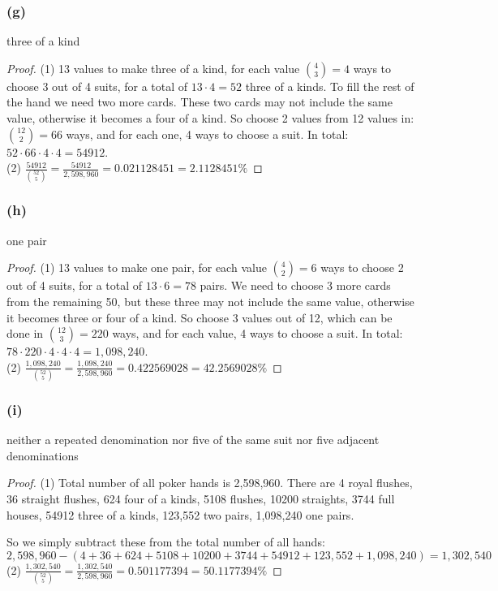 \documentclass[14pt]{extarticle}
\begin{document}
\subsubsection{(g)}
three of a kind

\begin{proof}
(1) 13 values to make three of a kind, for each value \(\binom{4}{3} = 4\) ways to choose 3 out of 4 suits, for a
total of \(13 \cdot 4 = 52\) three of a kinds. To fill the rest of the hand we need two more cards. These two cards may
not include the same value, otherwise it becomes a four of a kind. So choose 2 values from 12 values in: \(\binom{12}{2} = 
66\) ways, and for each one, 4 ways to choose a suit. In total: \(52 \cdot 66 \cdot 4 \cdot 4 = 54912\). \\
(2) \(\frac{54912}{\binom{52}{5}} = \frac{54912}{2,598,960} = 0.021128451 = 2.1128451\%\)
\end{proof}

\subsubsection{(h)}
one pair

\begin{proof}
(1) 13 values to make one pair, for each value \(\binom{4}{2} = 6\) ways to choose 2 out of 4 suits, for a total of 
\(13 \cdot 6 = 78\) pairs. We need to choose 3 more cards from the remaining 50, but these three may not include the same
value, otherwise it becomes three or four of a kind. So choose 3 values out of 12, which can be done in \(\binom{12}{3} = 
220\) ways, and for each value, 4 ways to choose a suit. In total: \(78 \cdot 220 \cdot 4 \cdot 4 \cdot 4 = 1,098,240\).\\
(2) \(\frac{1,098,240}{\binom{52}{5}} = \frac{1,098,240}{2,598,960} = 0.422569028 = 42.2569028\%\)
\end{proof}

\subsubsection{(i)}
neither a repeated denomination nor five of the same suit nor five adjacent denominations

\begin{proof}
(1) Total number of all poker hands is 2,598,960. There are 4 royal flushes, 36 straight flushes, 624 four of a kinds, 5108
flushes, 10200 straights, 3744 full houses, 54912 three of a kinds, 123,552 two pairs, 1,098,240 one pairs. 

So we simply subtract these from the total number of all hands:
\[
2,598,960 - (4 + 36 + 624 + 5108 + 10200 + 3744 + 54912 + 123,552 + 1,098,240) = 1,302,540
\]
(2) \(\frac{1,302,540}{\binom{52}{5}} = \frac{1,302,540}{2,598,960} = 0.501177394 = 50.1177394\%\)
\end{proof}
\end{document}
